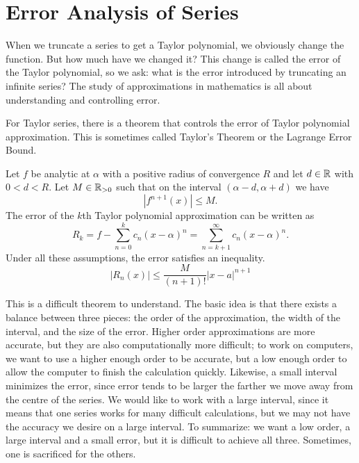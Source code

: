 \documentclass[fleqn,letterpaper]{report}
\begin{document}
\section{Error Analysis of Series}
\label{error-analysis}

When we truncate a series to get a Taylor polynomial, we
obviously change the function. But how much have we changed
it? This change is called the error of the Taylor polynomial,
so we ask: what is the error introduced by truncating an
infinite series? The study of approximations in mathematics is
all about understanding and controlling error.

For Taylor series, there is a theorem that controls
the error of Taylor polynomial approximation. This is
sometimes called Taylor's Theorem or the Lagrange Error Bound.

\begin{thm}
Let $f$ be analytic at $\alpha$ with a positive radius of convergence $R$
and let $d \in \mathbb{R}$ with $0<d<R$. Let $M \in \mathbb{R}_{> 0}$
such that on the interval $(\alpha-d, \alpha+d)$ we have
\begin{equation*}
|f^{n+1}(x)| \leq M.
\end{equation*}
The error of the $k$th Taylor polynomial approximation can be
written as
\begin{equation*}
R_k = f - \sum_{n=0}^k c_n (x-\alpha)^n = \sum_{n=k+1}^\infty c_n
(x-\alpha)^n.
\end{equation*}
Under all these assumptions, the error satisfies an inequality.
\begin{equation*}
|R_n(x)| \leq \frac{M}{(n+1)!} |x-a|^{n+1}
\end{equation*}
\end{thm}

This is a difficult theorem to understand. The basic idea is
that there exists a balance between three pieces: the order of
the approximation, the width of the interval, and the size of
the error. Higher order approximations are more accurate, but
they are also computationally more difficult; to work on
computers, we want to use a higher enough order to be
accurate, but a low enough order to allow the computer to
finish the calculation quickly. Likewise, a small interval
minimizes the error, since error tends to be larger the
farther we move away from the centre of the series. We would
like to work with a large interval, since it means that one
series works for many difficult calculations, but we may not
have the accuracy we desire on a large interval. To summarize:
we want a low order, a large interval and a small error, but
it is difficult to achieve all three. Sometimes, one is
sacrificed for the others.
\end{document}
